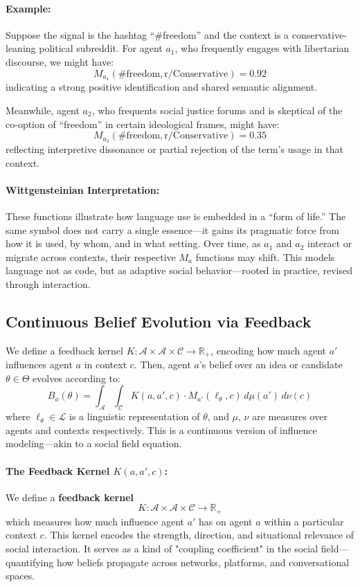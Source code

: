 \paragraph{Example:}
Suppose the signal is the hashtag “\#freedom” and the context is a conservative-leaning political subreddit. For agent \( a_1 \), who frequently engages with libertarian discourse, we might have:
\[
M_{a_1}(\text{\#freedom}, \text{r/Conservative}) = 0.92
\]
indicating a strong positive identification and shared semantic alignment.

Meanwhile, agent \( a_2 \), who frequents social justice forums and is skeptical of the co-option of “freedom” in certain ideological frames, might have:
\[
M_{a_2}(\text{\#freedom}, \text{r/Conservative}) = 0.35
\]
reflecting interpretive dissonance or partial rejection of the term’s usage in that context.

\paragraph{Wittgensteinian Interpretation:}
These functions illustrate how language use is embedded in a “form of life.” The same symbol does not carry a single essence—it gains its pragmatic force from how it is used, by whom, and in what setting. Over time, as \( a_1 \) and \( a_2 \) interact or migrate across contexts, their respective \( M_a \) functions may shift. This models language not as code, but as adaptive social behavior—rooted in practice, revised through interaction.

\subsection{Continuous Belief Evolution via Feedback}

We define a feedback kernel \( K: \mathcal{A} \times \mathcal{A} \times \mathcal{C} \to \mathbb{R}_+ \), encoding how much agent \( a' \) influences agent \( a \) in context \( c \). Then, agent \( a \)'s belief over an idea or candidate \( \theta \in \Theta \) evolves according to:
\[
B_a(\theta) = \int_{\mathcal{A}} \int_{\mathcal{C}} K(a, a', c) \cdot M_{a'}(\ell_{\theta}, c) \, d\mu(a') \, d\nu(c)
\]
where \( \ell_{\theta} \in \mathcal{L} \) is a linguistic representation of \( \theta \), and \( \mu \), \( \nu \) are measures over agents and contexts respectively. This is a continuous version of influence modeling—akin to a social field equation.

\paragraph{The Feedback Kernel \( K(a, a', c) \):}
We define a \textbf{feedback kernel}
\[
K: \mathcal{A} \times \mathcal{A} \times \mathcal{C} \to \mathbb{R}_+
\]
which measures how much influence agent \( a' \) has on agent \( a \) within a particular context \( c \). This kernel encodes the strength, direction, and situational relevance of social interaction. It serves as a kind of "coupling coefficient" in the social field—quantifying how beliefs propagate across networks, platforms, and conversational spaces.

